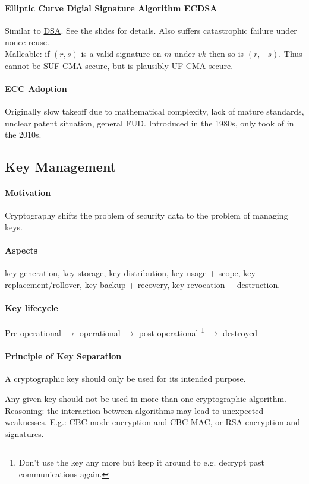 \paragraph{Elliptic Curve Digial Signature Algorithm ECDSA}
Similar to \hyperlink{dsa}{DSA}.
See the slides for details.
Also suffers catastrophic failure under nonce reuse.
\\
Malleable: if $(r,s)$ is a valid signature on $m$ under $vk$ then so is $(r,-s)$.
Thus cannot be SUF-CMA secure, but is plausibly UF-CMA secure.

\paragraph{ECC Adoption}
Originally slow takeoff due to mathematical complexity, lack of mature standards, unclear patent situation, general FUD.
Introduced in the 1980s, only took of in the 2010s.


\subsection{Key Management}

\paragraph{Motivation}
Cryptography shifts the problem of security data to the problem of managing keys.

\paragraph{Aspects}
key generation, key storage, key distribution, key usage + scope,
key replacement/rollover, key backup + recovery, key revocation + destruction.

\paragraph{Key lifecycle}
Pre-operational $\rightarrow$ operational $\rightarrow$ post-operational%
\footnote{Don't use the key any more but keep it around to e.g. decrypt past communications again.}
$\rightarrow$ destroyed

\paragraph{Principle of Key Separation}
A cryptographic key should only be used for its intended purpose.

Any given key should not be used in more than one cryptographic algorithm.
Reasoning: the interaction between algorithms may lead to unexpected weaknesses.
E.g.: CBC mode encryption and CBC-MAC, or RSA encryption and signatures.

